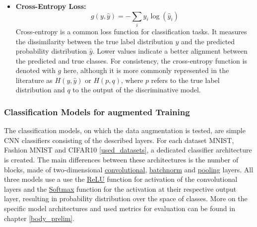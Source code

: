 \begin{itemize}
    \item \textbf{Cross-Entropy Loss:} \label{theoretical_loss_crossentropy}
    \begin{equation}
        g(y, \hat{y}) = -\sum_{i} y_i \log(\hat{y}_i)
    \end{equation}
    Cross-entropy is a common loss function for classification tasks. It measures the dissimilarity between the true label distribution \( y \) and the predicted probability distribution \( \hat{y} \). Lower values indicate a better alignment between the predicted and true classes. For consistency, the cross-entropy function is denoted with \( g \) here, although it is more commonly represented in the literature as \( H(y, \hat{y}) \) or \( H(p, q) \), where \( p \) refers to the true label distribution and \( q \) to the output of the discriminative model.


\end{itemize}

\subsubsection{Classification Models for augmented Training}
The classification models, on which the data augmentation is tested, are simple CNN classifiers consisting of the described layers. For each dataset MNIST, Fashion MNIST and CIFAR10 \ref{used_datasets}, a dedicated classifier architecture is created. The main differences between these architectures is the number of blocks, made of two-dimensional \hyperref[theoretical_classification_conv_layers]{convolutional}, \hyperref[theoretical_classification_batchnorm_layers]{batchnorm} and \hyperref[theoretical_classification_pooling_layers]{pooling} layers. All three models use a use the \hyperref[theoretical_activations_relu]{ReLU} function for activation of the convolutional layers and the \hyperref[theoretical_activations_softmax]{Softmax} function for the activation at their respective output layer, resulting in probability distribution over the space of classes. More on the specific model architectures and used metrics for evaluation can be found in chapter \ref{body_prelim}. %


